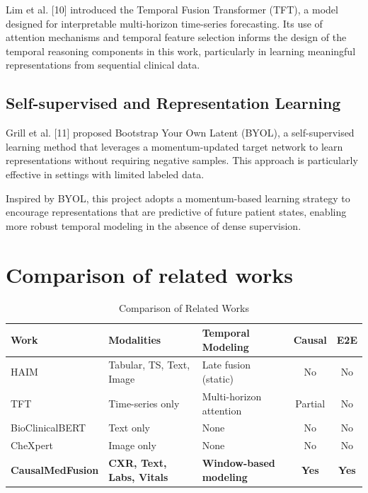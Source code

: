 \documentclass{fisatprojectfinal}
\begin{document}
Lim et al. [10] introduced the Temporal Fusion Transformer (TFT), a model designed for interpretable multi-horizon time-series forecasting. Its use of attention mechanisms and temporal feature selection informs the design of the temporal reasoning components in this work, particularly in learning meaningful representations from sequential clinical data.

\subsection{Self-supervised and Representation Learning}
Grill et al. [11] proposed Bootstrap Your Own Latent (BYOL), a self-supervised learning method that leverages a momentum-updated target network to learn representations without requiring negative samples. This approach is particularly effective in settings with limited labeled data.

Inspired by BYOL, this project adopts a momentum-based learning strategy to encourage representations that are predictive of future patient states, enabling more robust temporal modeling in the absence of dense supervision.


\section{Comparison of related works}

\begin{table}[ht]
\centering
\small %
\setlength{\tabcolsep}{4pt} %

\begin{tabularx}{\linewidth}{@{} l L L c c @{}}
\toprule
\textbf{Work} & \textbf{Modalities} & \textbf{Temporal Modeling} & \textbf{Causal} & \textbf{E2E} \\
\midrule
HAIM \cite{soenksen2022haim} & Tabular, TS, Text, Image & Late fusion (static) & No & No \\
\addlinespace
TFT \cite{lim2021temporal} & Time-series only & Multi-horizon attention & Partial & No \\
\addlinespace
BioClinicalBERT \cite{alsentzer2019publicly} & Text only & None & No & No \\
\addlinespace
CheXpert \cite{irvin2019chexpert} & Image only & None & No & No \\
\addlinespace
\textbf{CausalMedFusion} & \textbf{CXR, Text, Labs, Vitals} & \textbf{Window-based modeling} & \textbf{Yes} & \textbf{Yes} \\
\bottomrule
\end{tabularx}
\caption{Comparison of Related Works}
\label{tab:comparison}
\end{table}
\end{document}
